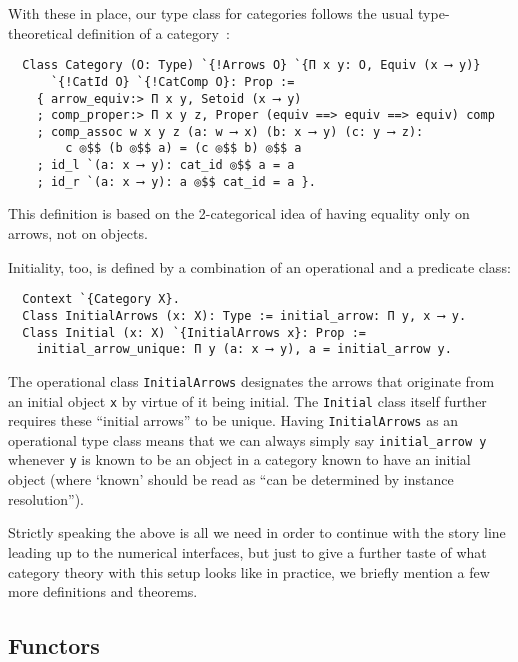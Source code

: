 \documentclass[a4paper,10pt,runningheads]{llncs}
\begin{document}
With these in place, our type class for categories follows the usual type-theoretical definition of a
category~\cite{saibi1995constructive}:
\begin{lstlisting}
  Class Category (O: Type) `{!Arrows O} `{Π x y: O, Equiv (x ⟶ y)}
      `{!CatId O} `{!CatComp O}: Prop :=
    { arrow_equiv:> Π x y, Setoid (x ⟶ y)
    ; comp_proper:> Π x y z, Proper (equiv ==> equiv ==> equiv) comp
    ; comp_assoc w x y z (a: w ⟶ x) (b: x ⟶ y) (c: y ⟶ z):
        c ◎$$ (b ◎$$ a) = (c ◎$$ b) ◎$$ a
    ; id_l `(a: x ⟶ y): cat_id ◎$$ a = a
    ; id_r `(a: x ⟶ y): a ◎$$ cat_id = a }.
\end{lstlisting}
This definition is based on the 2-categorical idea of having equality only on arrows, not on objects.

Initiality, too, is defined by a combination of an operational and a predicate class:
\begin{lstlisting}
  Context `{Category X}.
  Class InitialArrows (x: X): Type := initial_arrow: Π y, x ⟶ y.
  Class Initial (x: X) `{InitialArrows x}: Prop :=
    initial_arrow_unique: Π y (a: x ⟶ y), a = initial_arrow y.
\end{lstlisting}
The operational class \lstinline|InitialArrows| designates the arrows that originate from an initial object \lstinline|x| by virtue of it being initial. The \lstinline|Initial| class itself further requires these ``initial arrows'' to be unique. Having \lstinline|InitialArrows| as an operational type class means that we can always simply say \lstinline|initial_arrow y| whenever \lstinline|y| is known to be an object in a category known to have an initial object (where `known' should be read as ``can be determined by instance resolution'').

Strictly speaking the above is all we need in order to continue with the story line leading up to the numerical interfaces, but just to give a further taste of what category theory with this setup looks like in practice, we briefly mention a few more definitions and theorems.

\subsection{Functors}
\end{document}

